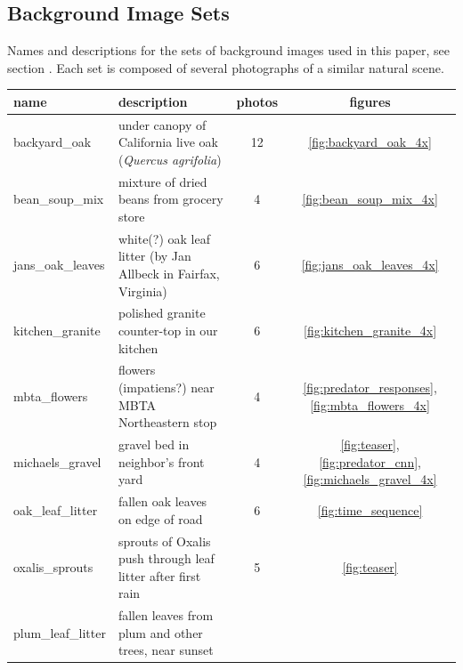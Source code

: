 \documentclass[letterpaper]{article}
\begin{document}

\subsection{Background Image Sets}
\begin{minipage}{\linewidth}
Names and descriptions for the sets of background images used in this paper, see section . Each set is composed of several photographs of a similar natural scene.
\par
\hspace*{1cm}
\begin{minipage}{\linewidth-1.1cm}
\begin{table}[H]
\raggedright 
\begin{tabular}{ |l|l|c|c| }
\hline
\textbf{name} & \textbf{description} & \textbf{photos} & \textbf{figures} \\ 
\hline
backyard\_oak &
    under canopy of California live oak (\textit{Quercus agrifolia}) &
    12 & \ref{fig:backyard_oak_4x} \\
\hline
bean\_soup\_mix &
    mixture of dried beans from grocery store &
    4 & \ref{fig:bean_soup_mix_4x} \\
\hline
jans\_oak\_leaves &
    white(?) oak leaf litter (by Jan Allbeck in Fairfax, Virginia) &
    6 & \ref{fig:jans_oak_leaves_4x} \\
\hline
kitchen\_granite &
    polished granite counter-top in our kitchen &
    6 & \ref{fig:kitchen_granite_4x} \\
\hline
mbta\_flowers &
    flowers (impatiens?) near MBTA Northeastern stop &
    4 & \ref{fig:predator_responses}, \ref{fig:mbta_flowers_4x} \\
\hline
michaels\_gravel &
    gravel bed in neighbor’s front yard &
    4 & \ref{fig:teaser}, \ref{fig:predator_cnn}, \ref{fig:michaels_gravel_4x} \\
\hline
oak\_leaf\_litter &
    fallen oak leaves on edge of road &
    6 & \ref{fig:time_sequence} \\
\hline
oxalis\_sprouts &
    sprouts of Oxalis push through leaf litter after first rain &
    5 & \ref{fig:teaser} \\
\hline
plum\_leaf\_litter &
    fallen leaves from plum and other trees, near sunset &

\end{tabular}
\end{table}
\end{minipage}
\end{minipage}
\end{document}
